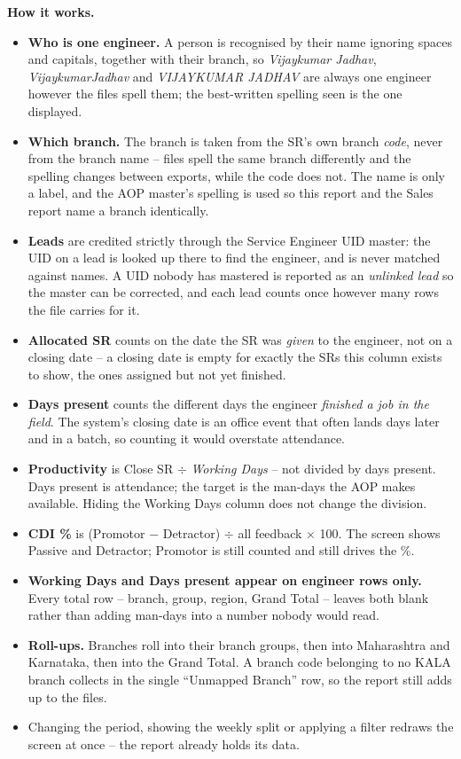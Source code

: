 \documentclass[11pt,a4paper]{article}
\newcommand{\devproc}{\textbf{How it works.}\par}
\newcommand{\qt}[1]{\textquotedblleft #1\textquotedblright}
\begin{document}
\devproc
\begin{itemize}
  \item \textbf{Who is one engineer.} A person is recognised by their name ignoring
  spaces and capitals, together with their branch, so \emph{Vijaykumar Jadhav},
  \emph{VijaykumarJadhav} and \emph{VIJAYKUMAR  JADHAV} are always one engineer however
  the files spell them; the best-written spelling seen is the one displayed.
  \item \textbf{Which branch.} The branch is taken from the SR's own branch \emph{code},
  never from the branch name -- files spell the same branch differently and the spelling
  changes between exports, while the code does not. The name is only a label, and the AOP
  master's spelling is used so this report and the Sales report name a branch identically.
  \item \textbf{Leads} are credited strictly through the Service Engineer UID master: the
  UID on a lead is looked up there to find the engineer, and is never matched against
  names. A UID nobody has mastered is reported as an \emph{unlinked lead} so the master
  can be corrected, and each lead counts once however many rows the file carries for it.
  \item \textbf{Allocated SR} counts on the date the SR was \emph{given} to the engineer,
  not on a closing date -- a closing date is empty for exactly the SRs this column exists
  to show, the ones assigned but not yet finished.
  \item \textbf{Days present} counts the different days the engineer \emph{finished a job
  in the field}. The system's closing date is an office event that often lands days later
  and in a batch, so counting it would overstate attendance.
  \item \textbf{Productivity} is Close SR $\div$ \emph{Working Days} -- not divided by
  days present. Days present is attendance; the target is the man-days the AOP makes
  available. Hiding the Working Days column does not change the division.
  \item \textbf{CDI \%} is (Promotor $-$ Detractor) $\div$ all feedback $\times$ 100. The
  screen shows Passive and Detractor; Promotor is still counted and still drives the \%.
  \item \textbf{Working Days and Days present appear on engineer rows only.} Every total
  row -- branch, group, region, Grand Total -- leaves both blank rather than adding
  man-days into a number nobody would read.
  \item \textbf{Roll-ups.} Branches roll into their branch groups, then into Maharashtra
  and Karnataka, then into the Grand Total. A branch code belonging to no KALA branch
  collects in the single \qt{Unmapped Branch} row, so the report still adds up to the
  files.
  \item Changing the period, showing the weekly split or applying a filter redraws the
  screen at once -- the report already holds its data.
\end{itemize}
\end{document}
